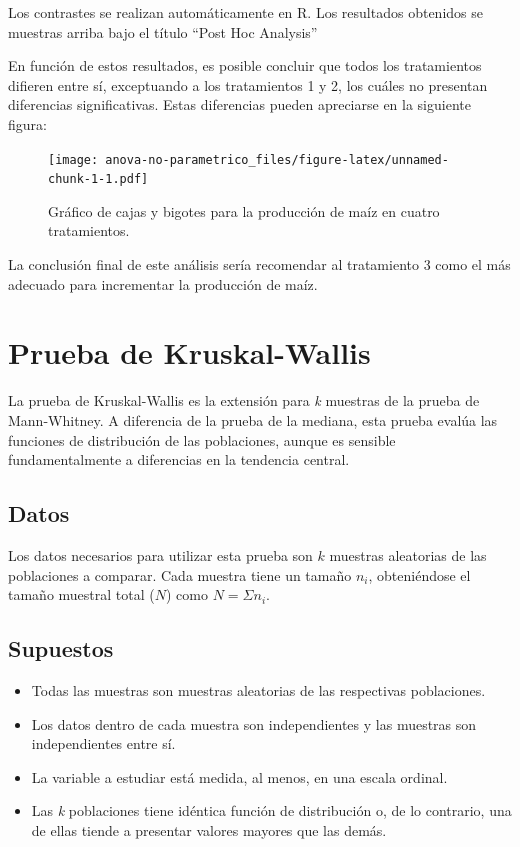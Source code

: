 \documentclass[]{book}
\theoremstyle{definition}
\theoremstyle{definition}
\theoremstyle{definition}
\theoremstyle{remark}
\begin{document}
Los contrastes se realizan automáticamente en R. Los resultados
obtenidos se muestras arriba bajo el título ``Post Hoc Analysis''

En función de estos resultados, es posible concluir que todos los
tratamientos difieren entre sí, exceptuando a los tratamientos 1 y 2,
los cuáles no presentan diferencias significativas. Estas diferencias
pueden apreciarse en la siguiente figura:




\begin{figure}
\centering
\texttt{[image: anova-no-parametrico\_files/figure-latex/unnamed-chunk-1-1.pdf]}
\caption{\label{fig:unnamed-chunk-1}Gráfico de cajas y bigotes para la producción de
maíz en cuatro tratamientos.}
\end{figure}

La conclusión final de este análisis sería recomendar al tratamiento 3
como el más adecuado para incrementar la producción de maíz.

\hypertarget{prueba-de-kruskal-wallis}{%
\section{Prueba de Kruskal-Wallis}\label{prueba-de-kruskal-wallis}}

La prueba de Kruskal-Wallis es la extensión para \emph{k} muestras de la
prueba de Mann-Whitney. A diferencia de la prueba de la mediana, esta
prueba evalúa las funciones de distribución de las poblaciones, aunque
es sensible fundamentalmente a diferencias en la tendencia central.

\hypertarget{datos-2}{%
\subsection{Datos}\label{datos-2}}

Los datos necesarios para utilizar esta prueba son \(k\) muestras
aleatorias de las poblaciones a comparar. Cada muestra tiene un tamaño
\(n_{i}\), obteniéndose el tamaño muestral total (\(N\)) como
\(N = \Sigma n_{i}\).

\hypertarget{supuestos-3}{%
\subsection{Supuestos}\label{supuestos-3}}

\begin{itemize}
\item
  Todas las muestras son muestras aleatorias de las respectivas
  poblaciones.
\item
  Los datos dentro de cada muestra son independientes y las muestras son
  independientes entre sí.
\item
  La variable a estudiar está medida, al menos, en una escala ordinal.
\item
  Las \emph{k} poblaciones tiene idéntica función de distribución o, de
  lo contrario, una de ellas tiende a presentar valores mayores que las
  demás.
\end{itemize}
\end{document}
